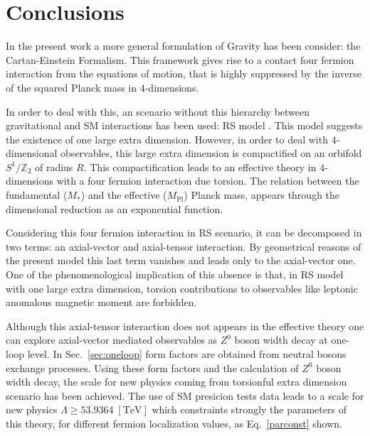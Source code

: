 \section{\label{sec:conclusions}Conclusions}

In the present work a more general formulation of Gravity has been consider: the Cartan-Einstein Formalism. This framework gives rise to a contact four fermion interaction from the equations of motion, that is highly suppressed by the inverse of the squared Planck mass in $4$-dimensions. 

In order to deal with this, an scenario without this hierarchy between gravitational and SM interactions has been used: RS model \cite{Randall:1999ee}. This model suggests the existence of one large extra dimension. However, in order to deal with $4$-dimensional observables, this large extra dimension is compactified on an orbifold $S^1/\mathbb{Z}_2$ of radius $R$. This compactification leads to an effective theory in $4$-dimensions with a four fermion interaction due torsion. The relation between the fundamental ($M_*$) and the effective ($M_{\text{Pl}}$) Planck mass, appears through the dimensional reduction as an exponential function.  

Considering this four fermion interaction in RS scenario, it can be decomposed in two terms: an axial-vector and axial-tensor interaction. By geometrical reasons of the present model this last term vanishes and leads only to the axial-vector one. One of the phenomenological implication of this absence is that, in RS model with one large extra dimension, torsion contributions to observables like leptonic anomalous magnetic moment are forbidden. 

Although this axial-tensor interaction does not appears in the effective theory one can explore axial-vector mediated observables as $Z^0$ boson width decay at one-loop level. In Sec.~\ref{sec:oneloop} form factors are obtained from neutral bosons exchange processes. Using these form factors and the calculation of $Z^0$ boson width decay, the scale for new physics coming from torsionful extra dimension scenario has been achieved. The use of SM presicion tests data leads to a scale for new physics $ \Lambda \geq 53.9364\;[\text{TeV}]$ which constraints strongly the parameters of this theory, for different fermion localization values, as Eq.~\eqref{parconst} shown.
